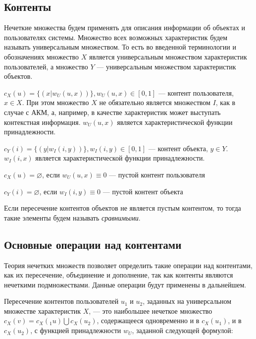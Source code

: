 \subsection{Контенты}
Нечеткие множества будем применять для описания информации об объектах и
пользователях системы.
Множество всех возможных характеристик будем называть
универсальным множеством. То есть во введенной терминологии и обозначениях
множество $X$ является универсальным множеством
характеристик пользователей,
а множество $Y$ --- универсальным множеством характеристик объектов.

\begin{defn}
				$c_X(u) = \{(x | w_U(u, x )) \}, w_U(u, x) \in [0,1]$ ---
				контент пользователя, $x \in X$. При этом множество $X$ не
				обязательно является множеством $I$, как в случае с АКМ, а,
				например, в качестве характеристик может выступать контекстная
				информация.
				$w_U(u, x)$ является
				характеристической функции принадлежности.
\end{defn}


\begin{defn}
				$c_Y(i) = \{(y | w_I(i, y )) \}, w_I(i, y) \in [0,1]$ ---
				контент объекта, $y \in Y$.
				$w_I(i, x)$ является
				характеристической функции принадлежности.

\end{defn}

\begin{defn}
				$c_X(u) = \varnothing$, если $w_U(u, x) \equiv 0$ ---
				пустой контент пользователя
\end{defn}

\begin{defn}
				$c_Y(i) = \varnothing$, если $w_I(i, y) \equiv 0$ ---
				пустой контент объекта

\end{defn}

\begin{defn}
	Если пересечение контентов объектов не является пустым контентом, то тогда
	такие элементы будем называть {\it сравнимыми}.
\end{defn}

\subsection{Основные операции над контентами}
Теория нечетких множеств позволяет определить такие операции над контентами,
как их пересечение, объединение и дополнение, так как контенты
являются нечеткими подмножествами. Данные операции будут применены в дальнейшем.
\begin{defn}
	Пересечение контентов пользователей $u_1$ и $u_2$, заданных на универсальном множестве характеристик
	$X$, --- это наибольшее нечеткое множество $c_X(v) = c_X(_1u)
	\bigcup c_X(u_2)$,
	содержащееся одновременно и в $c_X(u_1)$, и в $c_X(u_2)$,
	с функцией принадлежности $w_U$, заданной следующей формулой:
\end{defn}

